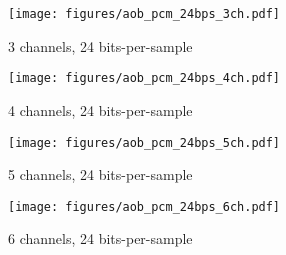 \clearpage

\begin{figure}[h!]
\texttt{[image: figures/aob\_pcm\_24bps\_3ch.pdf]}
\caption{3 channels, 24 bits-per-sample}
\end{figure}

\begin{figure}[h!]
\texttt{[image: figures/aob\_pcm\_24bps\_4ch.pdf]}
\caption{4 channels, 24 bits-per-sample}
\end{figure}

\clearpage

\begin{figure}[h!]
\texttt{[image: figures/aob\_pcm\_24bps\_5ch.pdf]}
\caption{5 channels, 24 bits-per-sample}
\end{figure}

\begin{figure}[h!]
\texttt{[image: figures/aob\_pcm\_24bps\_6ch.pdf]}
\caption{6 channels, 24 bits-per-sample}
\end{figure}


\clearpage
\label{aob_mlp}

